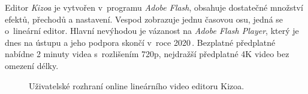 Editor \textit{Kizoa} je vytvořen v~programu \textit{Adobe Flash}, obsahuje dostatečné množství efektů, přechodů a nastavení. Vespod zobrazuje jednu časovou osu, jedná se o~lineární editor. Hlavní nevýhodou je vázanost na \textit{Adobe Flash Player}, který je dnes na ústupu a jeho podpora skončí v~roce 2020\,\cite{FlashPlayer}. Bezplatné předplatné nabídne 2 minuty videa s~rozlišením 720p, nejdražší předplatné 4K video bez omezení délky.
\begin{figure}[h]
	\centering
	\caption{Uživatelské rozhraní online lineárního video editoru Kizoa.}\label{img:kizoa}
\end{figure}

